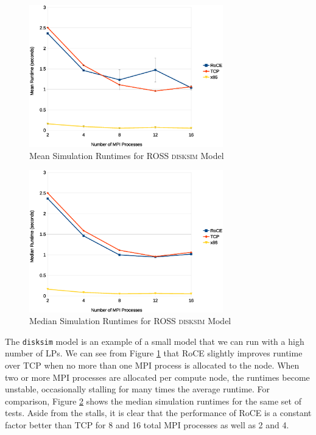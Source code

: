 \documentclass[11pt]{book}
\begin{document}
\begin{figure}
\centering
\includegraphics[width=0.75\textwidth]{disksim}
\caption{Mean Simulation Runtimes for ROSS \textsc{disksim} Model}
\label{disksim}
\end{figure}

\begin{figure}
\centering
\includegraphics[width=0.75\textwidth]{disksim_median}
\caption{Median Simulation Runtimes for ROSS \textsc{disksim} Model}
\label{disksim-median}
\end{figure}

The \verb;disksim; model is an example of a small model that we can run with a
high number of LPs. We can see from Figure \ref{disksim} that RoCE
slightly improves runtime over TCP when no more than one MPI process is
allocated to the node. When two or more MPI processes are allocated per compute
node, the runtimes become unstable, occasionally stalling for many times the
average runtime. For comparison, Figure \ref{disksim-median} shows the
median simulation runtimes for the same set of tests. Aside from the stalls, it
is clear that the performance of RoCE is a constant factor better than TCP for 8
and 16 total MPI processes as well as 2 and 4.
\end{document}
